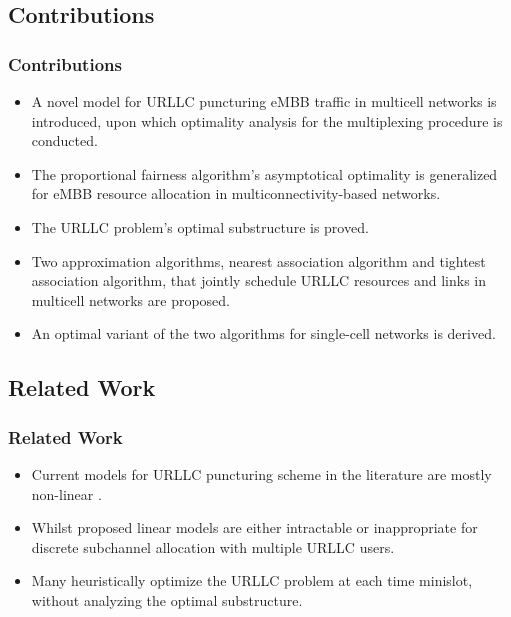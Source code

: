 \subsection{Contributions}
\begin{frame}
  \frametitle{Contributions}
  \begin{itemize}
    \item A novel  model for URLLC puncturing eMBB traffic in multicell networks is introduced, upon which optimality analysis for the multiplexing procedure is conducted.
    \item The proportional fairness algorithm's asymptotical optimality \cite{KW02} is generalized for eMBB resource allocation in multiconnectivity-based networks.
    \item The URLLC problem's optimal substructure is proved.
    \item Two approximation algorithms, nearest association algorithm and tightest association algorithm, that jointly schedule URLLC resources and links in multicell networks are proposed.
    \item An optimal variant of the two algorithms for single-cell networks is derived.
  \end{itemize}
\end{frame}

\subsection{Related Work}
\begin{frame}
  \frametitle{Related Work}
  \begin{itemize}
    \item Current models for URLLC puncturing scheme in the literature are mostly non-linear \cite{BMATAMHH21}.
    \item Whilst proposed linear models are either intractable \cite{YZR21} or inappropriate \cite{AVS20} for discrete subchannel allocation with multiple URLLC users.
    \item Many \cite{BMATAMHH21, YZR21} heuristically optimize the URLLC problem at each time minislot, without analyzing the optimal substructure.
  \end{itemize}
\end{frame}
